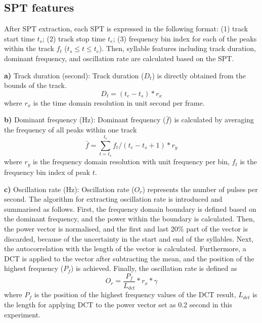 \subsection{SPT features}

After SPT extraction, each SPT is expressed in the following format: (1) track start time $t_{s}$; (2) track stop time $t_{e}$; (3) frequency bin index for each of the peaks within the track $f_{t}$ ($t_{s} \leq t \leq t_{e}$).  Then, syllable features including track duration, dominant frequency, and oscillation rate are calculated based on the SPT.

\noindent \textbf{a)} Track duration (second):
Track duration ($D_{t}$) is directly obtained from the bounds of the track.
\begin{equation}
D_{t} = (t_{e}-t_{s})*r_{x}
\end{equation}
\noindent where $r_{x}$ is the time domain resolution in unit second per frame.

\noindent \textbf{b)} Dominant frequency (Hz): 
Dominant frequency ($\bar{f}$) is calculated by averaging the frequency of all peaks within one track
\begin{equation}
\bar{f} = \sum_{t=t_{s}}^{t_{e}}f_{t}/(t_{e}-t_{s}+1)*r_{y}
\end{equation}
where $r_{y}$ is the frequency domain resolution with unit frequency per bin, $f_{t}$ is the frequency bin index of peak $t$.

\noindent  \textbf{c)} Oscillation rate (Hz):  
Oscillation rate ($O_{r}$) represents the number of pulses per second. The algorithm for extracting oscillation rate is introduced and summarised as follows.
First, the frequency domain boundary is defined based on the dominant frequency, and the power within the boundary is calculated. Then, the power vector is normalised, and the first and last 20\% part of the vector is discarded, because of the uncertainty in the start and end of the syllables. Next, the autocorrelation with the length of the vector is calculated. Furthermore, a DCT is applied to the vector after subtracting the mean, and the position of the highest frequency ($P_{f}$) is achieved. Finally, the oscillation rate is defined as
\begin{equation}
O_{r}= \frac{P_{f}}{L_{dct}}*r_{x}*\gamma
\end{equation}
\noindent where $P_{f}$ is the position of the highest frequency values of the DCT result, $L_{dct}$ is the length for applying DCT to the power vector set as 0.2 second in this experiment. 



